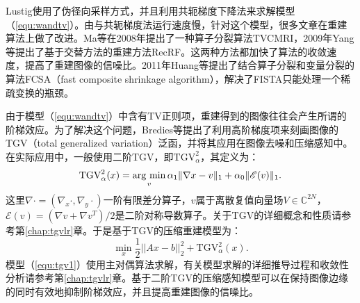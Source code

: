 Lustig使用了伪径向采样方式，并且利用共轭梯度下降法来求解模型（\ref{equ:wandtv}）。由与共轭梯度法运行速度慢，针对这个模型，很多文章在重建算法上做了改进。Ma等在2008年提出了一种算子分裂算法TVCMRI\cite{tvcmri}，2009年Yang等提出了基于交替方法的重建方法RecRF\cite{Yang2010A}。这两种方法都加快了算法的收敛速度，提高了重建图像的信噪比。2011年Huang\cite{Huang2011Efficient}等提出了结合算子分裂和变量分裂的算法FCSA（fast composite shrinkage algorithm），解决了FISTA只能处理一个稀疏变换的瓶颈。

由于模型（\ref{equ:wandtv}）中含有TV正则项，重建得到的图像往往会产生所谓的阶梯效应。为了解决这个问题，Bredies等\cite{bredies2010total}提出了利用高阶梯度项来刻画图像的TGV（total generalized variation）泛函，并将其应用在图像去噪\cite{infimaltgv}和压缩感知\cite{tgv}中。在实际应用中，一般使用二阶TGV，即$\mathrm{TGV}_{\alpha}^2$，其定义为：
$$\mathrm{TGV}_\alpha^2(x)=\argmin_v \alpha_1\|\nabla x-v\|_1+\alpha_0\|\mathscr{E}(v)\|_1.$$
这里$\nabla \cdot=(\nabla_x \cdot, \nabla_y \cdot)$一阶有限差分算子，$v$属于离散复值向量场$V\in \mathbb{C}^{2N}$，$\mathscr{E}(v)=(\nabla v+\nabla v^T)/2$是二阶对称导数算子。关于TGV的详细概念和性质请参考第\ref{chap:tgvlr}章。于是基于TGV的压缩重建模型为：
\begin{equation}
	\min_x\frac{1}{2}||Ax-b||^2_2 + \mathrm{TGV}_{\alpha}^2(x).
	\label{equ:tgv1}
\end{equation}
模型（\ref{equ:tgv1}）使用主对偶算法求解，有关模型求解的详细推导过程和收敛性分析请参考第\ref{chap:tgvlr}章。基于二阶TGV的压缩感知模型可以在保持图像边缘的同时有效地抑制阶梯效应，并且提高重建图像的信噪比。

